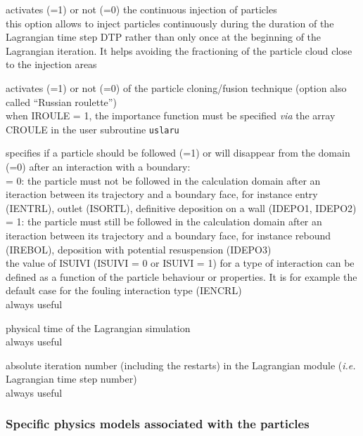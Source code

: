 {activates (=1) or not (=0) the continuous injection of particles\\
this option allows to inject particles continuously during the duration of the
Lagrangian time step DTP rather than only once at the
beginning of the Lagrangian iteration. It helps avoiding the fractioning of
the particle cloud close to the injection areas}

{activates (=1) or not (=0) of the particle cloning/fusion technique
(option also called ``Russian roulette'')\\
when IROULE = 1, the importance function must be specified {\em via} the
array CROULE in the user subroutine \texttt{uslaru}}

{specifies if a particle should be followed (=1) or will disappear from the
domain (=0) after an interaction with a boundary:\\
\hspace*{1.3cm} = 0: the particle must not be followed in the
calculation domain after an iteraction between its trajectory and a
boundary face, for instance entry (IENTRL), outlet (ISORTL), definitive
deposition on a wall (IDEPO1, IDEPO2)\\
\hspace*{1.3cm} = 1: the particle must still be followed in the
calculation domain after an iteraction between its trajectory and a
boundary face, for instance rebound (IREBOL), deposition with potential
resuspension (IDEPO3)\\
the value of ISUIVI (ISUIVI = 0 or ISUIVI = 1) for a type of interaction
can be defined as a function of the particle behaviour or properties. It
is for example the default case for the fouling interaction type (IENCRL)\\
always useful}

{physical time of the Lagrangian simulation \\
always useful}

{absolute iteration number (including the restarts) in the Lagrangian
module ({\em i.e.} Lagrangian time step number) \\
always useful}


\subsubsection{Specific physics models associated with the particles}

